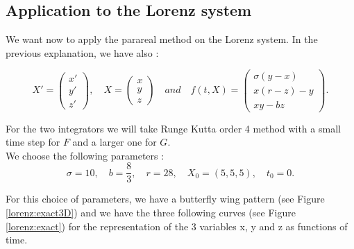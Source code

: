 \subsection{Application to the Lorenz system}

We want now to apply the parareal method on the Lorenz system. In the previous explanation, we have also :

$$X'=\begin{pmatrix}
    x' \\
    y' \\
    z'
\end{pmatrix}, \quad X=\begin{pmatrix}
    x \\
    y \\
    z
\end{pmatrix} \quad and \quad f(t,X)=\begin{pmatrix}
    \sigma(y-x) \\
    x(r-z)-y \\
    xy-bz
\end{pmatrix}.$$

\noindent For the two integrators we will take Runge Kutta order 4 method with a small time step for $F$ and a larger one for $G$. \\

\noindent We choose the following parameters :
$$\sigma=10, \quad b=\frac{8}{3}, \quad r=28, \quad X_0=(5,5,5), \quad t_0=0.$$

\noindent For this choice of parameters, we have a butterfly wing pattern (see Figure \ref{lorenz:exact3D}) and we have the three following curves (see Figure \ref{lorenz:exact}) for the representation of the 3 variables x, y and z as functions of time.

